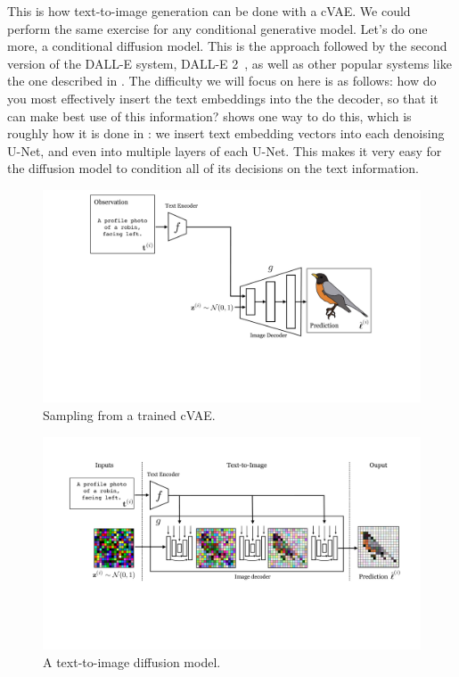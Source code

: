 This is how text-to-image generation can be done with a cVAE. We could perform the same exercise for any conditional generative model. Let's do one more, a conditional diffusion model. This is the approach followed by the second version of the DALL-E system, DALL-E 2~\cite{ramesh2022hierarchical}, as well as other popular systems like the one described in \cite{rombach2022high}. The difficulty we will focus on here is as follows: how do you most effectively insert the text embeddings into the the decoder, so that it can make best use of this information? \Fig{\ref{fig:vision_and_language:text2im_diffusion_model}} shows one way to do this, which is roughly how it is done in \cite{rombach2022high}: we insert text embedding vectors into each denoising U-Net, and even into multiple layers of each U-Net. This makes it very easy for the diffusion model to condition all of its decisions on the text information.
\begin{figure}[h!]
    \centerline{
        \includegraphics[width=1.0\linewidth]{./figures/vision_and_language/text2im_VAE_sampling.pdf}
    }
    \caption{Sampling from a trained cVAE.}
    \label{fig:vision_and_language:text2im_VAE_sampling}
\end{figure}
\begin{figure}[h!]
    \centerline{
        \includegraphics[width=1.0\linewidth]{./figures/vision_and_language/text2im_diffusion_model.pdf}
    }
    \caption{A text-to-image diffusion model.}
    \label{fig:vision_and_language:text2im_diffusion_model}
\end{figure}
